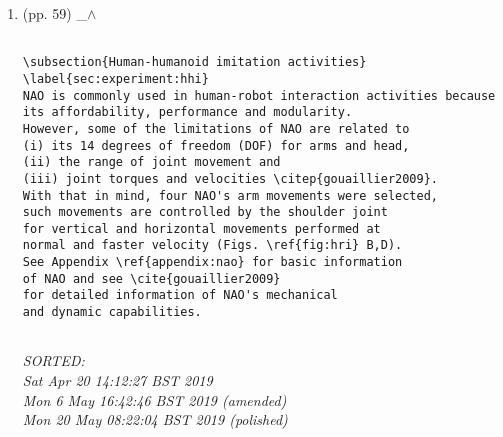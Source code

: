 \documentclass[12pt]{article}
\begin{document}
\begin{enumerate}

\item  (pp. 59)  \_$\wedge$  


%



	\begin{verbatim}

\subsection{Human-humanoid imitation activities} \label{sec:experiment:hhi}
NAO is commonly used in human-robot interaction activities because 
its affordability, performance and modularity.
However, some of the limitations of NAO are related to 
(i) its 14 degrees of freedom (DOF) for arms and head,
(ii) the range of joint movement and 
(iii) joint torques and velocities \citep{gouaillier2009}. 
With that in mind, four NAO's arm movements were selected,
such movements are controlled by the shoulder joint 
for vertical and horizontal movements performed at 
normal and faster velocity (Figs. \ref{fig:hri} B,D).
See Appendix \ref{appendix:nao} for basic information 
of NAO and see \cite{gouaillier2009} 
for detailed information of NAO's mechanical 
and dynamic capabilities.
	
	\end{verbatim}
	\textit{
	SORTED: \\
	Sat Apr 20 14:12:27 BST 2019 \\
	Mon  6 May 16:42:46 BST 2019 (amended) \\
	Mon 20 May 08:22:04 BST 2019 (polished)
	}
	\\










\end{enumerate}
\end{document}
